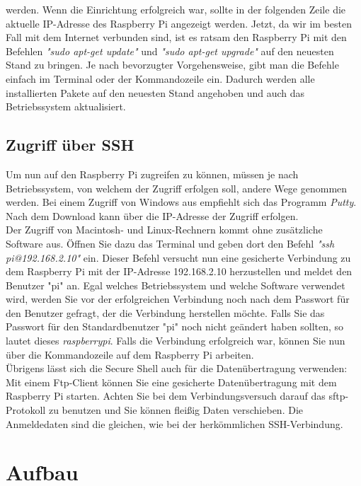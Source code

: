 \documentclass[12pt,a4paper]{scrreprt}
\begin{document}
werden. Wenn die Einrichtung erfolgreich war, sollte in der folgenden Zeile die aktuelle IP-Adresse des Raspberry Pi angezeigt werden. Jetzt, da wir im besten Fall mit dem Internet verbunden sind, ist es ratsam den Raspberry Pi mit den Befehlen \textit{"sudo apt-get update"} und \textit{"sudo apt-get upgrade"} auf den neuesten Stand zu bringen. Je nach bevorzugter Vorgehensweise, gibt man die Befehle einfach im Terminal oder der Kommandozeile ein. Dadurch werden alle installierten Pakete auf den neuesten Stand angehoben und auch das Betriebssystem aktualisiert.


\section{Zugriff über SSH}
Um nun auf den Raspberry Pi zugreifen zu können, müssen je nach Betriebssystem, von welchem der Zugriff erfolgen soll, andere Wege genommen werden. Bei einem Zugriff von Windows aus empfiehlt sich das Programm \textit{Putty}. Nach dem Download kann über die IP-Adresse der Zugriff erfolgen. \\Der Zugriff von Macintosh- und Linux-Rechnern kommt ohne zusätzliche Software aus. Öffnen Sie dazu das Terminal und geben dort den Befehl \textit{"ssh pi@192.168.2.10"} ein. Dieser Befehl versucht nun eine gesicherte Verbindung zu dem Raspberry Pi mit der IP-Adresse 192.168.2.10 herzustellen und meldet den Benutzer "pi" an. Egal welches Betriebssystem und welche Software verwendet wird, werden Sie vor der erfolgreichen Verbindung noch nach dem Passwort für den Benutzer gefragt, der die Verbindung herstellen möchte. Falls Sie das Passwort für den Standardbenutzer "pi" noch nicht geändert haben sollten, so lautet dieses \textit{raspberrypi}. Falls die Verbindung erfolgreich war, können Sie nun über die Kommandozeile auf dem Raspberry Pi arbeiten. \\ Übrigens lässt sich die Secure Shell auch für die Datenübertragung verwenden: Mit einem Ftp-Client können Sie eine gesicherte Datenübertragung mit dem Raspberry Pi starten. Achten Sie bei dem Verbindungsversuch darauf das sftp-Protokoll zu benutzen und Sie können fleißig Daten verschieben. Die Anmeldedaten sind die gleichen, wie bei der herkömmlichen SSH-Verbindung.

\chapter{Aufbau}
\end{document}
